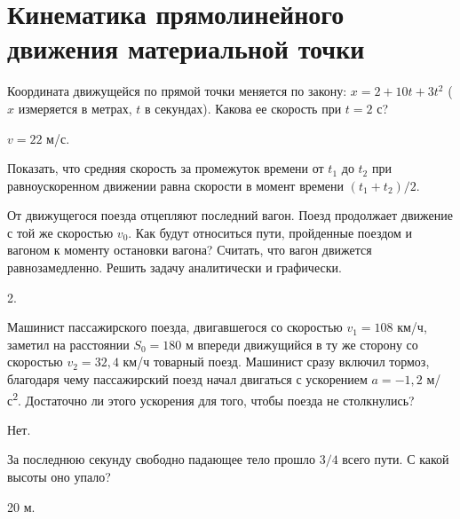 \section{Кинематика прямолинейного движения материальной точки}

\introProblems

\begin{ex} %
Координата движущейся по прямой точки меняется по закону: $x = 2 + 10t + 3t^2$ ($x$ измеряется в метрах, $t$ в секундах). Какова ее скорость при $t = 2$ с?
\begin{ans}
$v = 22$ м/с.
\end{ans}
\end{ex}

\begin{ex} %
Показать, что средняя скорость за промежуток времени от $t_1$ до $t_2$ при равноускоренном движении равна скорости в момент времени $(t_1 + t_2)/2$.
\begin{ans}
\end{ans}
\end{ex}

\begin{ex} %
От движущегося поезда отцепляют последний вагон. Поезд продолжает движение с той же скоростью $v_0$. Как будут относиться пути, пройденные поездом и вагоном к моменту остановки вагона? Считать, что вагон движется равнозамедленно. Решить задачу аналитически и графически.
\begin{ans}
2.
\end{ans}
\end{ex}

\begin{ex} %
Машинист пассажирского поезда, двигавшегося со скоростью $v_1 = 108$ км/ч, заметил на расстоянии $S_0 = 180$ м впереди движущийся в ту же сторону со скоростью $v_2 = 32,4$ км/ч товарный поезд. Машинист сразу включил тормоз, благодаря чему пассажирский поезд начал двигаться с ускорением $a = -1,2$ м/с\textsuperscript{2}. Достаточно ли этого ускорения для того, чтобы поезда не столкнулись?
\begin{ans}
Нет.
\end{ans}
\end{ex}

\begin{ex} %
За последнюю секунду свободно падающее тело прошло $3/4$ всего пути. С какой высоты оно упало?
\begin{ans}
20 м.
\end{ans}
\end{ex}


